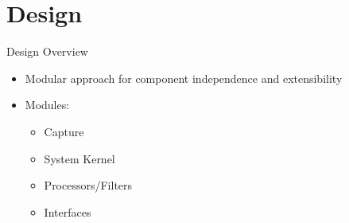 \documentclass{beamer}
\begin{document}

\section{Design}

\begin{frame}{Design Overview}
    \begin{itemize}
        \item Modular approach for component independence and extensibility
        \item Modules:
        \begin{itemize}
            \item Capture
            \item System Kernel
            \item Processors/Filters
            \item Interfaces
        \end{itemize}
    \end{itemize}
\end{frame}

\end{document}

